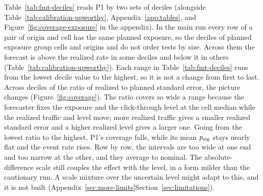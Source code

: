 \begin{table}[t]\centering\scriptsize
\caption{P1 across two sets of deciles on the headline archive. Each cell gives the range from the lowest to the highest of the ten deciles, apart from the ratio row's coverage, which drops from the first decile to the last (Tables~\ref{tab:calibration-upworthy} and~\ref{tab:coverage-ratio}). The rows are deciles of planned exposure and deciles of the ratio of realized to planned standard error, together with the span of that ratio. The columns give P1's mean $\psig$, the realized event rate, and the coverage of the 90 percent interval.}
\label{tab:fmt-deciles}
\resizebox{\columnwidth}{!}{%
}
\end{table}

Table~\ref{tab:fmt-deciles} reads P1 by two sets of deciles (alongside Table~\ref{tab:calibration-upworthy}, Appendix~\ref{app:tables}, and Figure~\ref{fig:coverage-exposure} in the appendix). In the main run every row of a pair of origin and cell has the same planned exposure, so the deciles of planned exposure group cells and origins and do not order tests by size. Across them the forecast is above the realized rate in some deciles and below it in others (Table~\ref{tab:calibration-upworthy}). Each range in Table~\ref{tab:fmt-deciles} runs from the lowest decile value to the highest, so it is not a change from first to last.
Across deciles of the ratio of realized to planned standard error, the picture changes (Figure~\ref{fig:coverage}). The ratio covers so wide a range because the forecaster fixes the exposure and the click-through level at the cell median while the realized traffic and level move; more realized traffic gives a smaller realized standard error and a higher realized level gives a larger one. Going from the lowest ratio to the highest, P1's coverage falls, while its mean $\psig$ stays nearly flat and the event rate rises. Row by row, the intervals are too wide at one end and too narrow at the other, and they average to nominal. The absolute-difference scale still couples the effect with the level, in a form milder than the cautionary run. A scale mixture over the uncertain level might adapt to this, and it is not built (\iftmlr Appendix~\ref{sec:more-limits}\else Section~\ref{sec:limitations}\fi).


